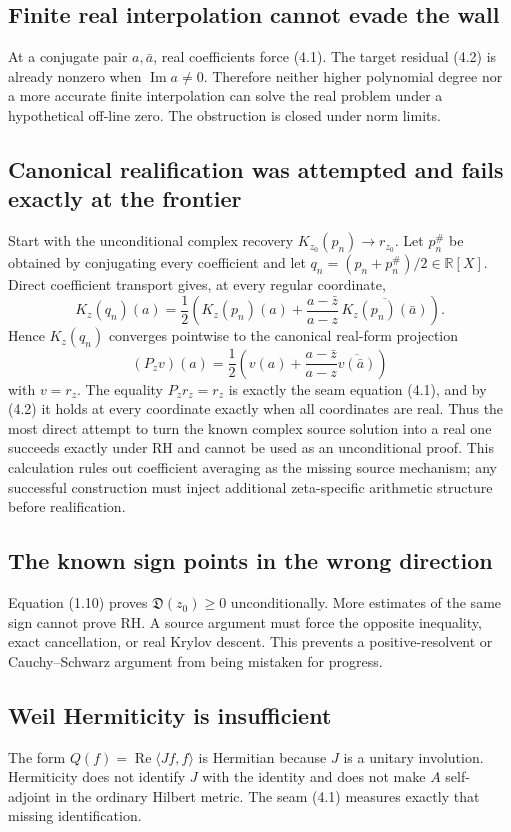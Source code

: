 \documentclass[11pt]{article}
\theoremstyle{definition}
\theoremstyle{remark}
\newcommand{\R}{\mathbb R}
\newcommand{\Rea}{\operatorname{Re}}
\newcommand{\Ima}{\operatorname{Im}}
\newcommand{\ip}[2]{\langle #1,#2\rangle}
\begin{document}
\subsection*{Finite real interpolation cannot evade the wall}
At a conjugate pair $a,\bar a$, real coefficients force (4.1).  The target residual (4.2) is
already nonzero when $\Ima a\ne0$.  Therefore neither higher polynomial degree nor a more
accurate finite interpolation can solve the real problem under a hypothetical off-line zero.
The obstruction is closed under norm limits.

\subsection*{Canonical realification was attempted and fails exactly at the frontier}
Start with the unconditional complex recovery $K_{z_0}(p_n)\to r_{z_0}$.  Let $p_n^\#$ be
obtained by conjugating every coefficient and let
$q_n=(p_n+p_n^\#)/2\in\R[X]$.  Direct coefficient transport gives, at every regular coordinate,
\begin{equation}
 K_z(q_n)(a)=\frac12\left(
 K_z(p_n)(a)+\frac{a-\bar z}{a-z}\,
       \overline{K_z(p_n)(\bar a)}\right).               \tag{7.1}
\end{equation}
Hence $K_z(q_n)$ converges pointwise to the canonical real-form projection
\[
 (P_zv)(a)=\frac12\left(v(a)+\frac{a-\bar z}{a-z}\overline{v(\bar a)}\right)
\]
with $v=r_z$.  The equality $P_zr_z=r_z$ is exactly the seam equation (4.1), and by (4.2) it
holds at every coordinate exactly when all coordinates are real.  Thus the most direct attempt
to turn the known complex source solution into a real one succeeds exactly under RH and cannot
be used as an unconditional proof.  This calculation rules out coefficient averaging as the
missing source mechanism; any successful construction must inject additional zeta-specific
arithmetic structure before realification.

\subsection*{The known sign points in the wrong direction}
Equation (1.10) proves $\mathfrak D(z_0)\geq0$ unconditionally.  More estimates of the same sign
cannot prove RH.  A source argument must force the opposite inequality, exact cancellation, or
real Krylov descent.  This prevents a positive-resolvent or Cauchy--Schwarz argument from being
mistaken for progress.

\subsection*{Weil Hermiticity is insufficient}
The form $Q(f)=\Rea\ip{Jf}{f}$ is Hermitian because $J$ is a unitary involution.  Hermiticity does
not identify $J$ with the identity and does not make $A$ self-adjoint in the ordinary Hilbert
metric.  The seam (4.1) measures exactly that missing identification.
\end{document}
